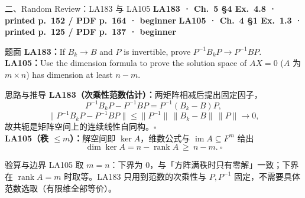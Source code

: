 \documentclass[aspectratio=169,10pt,fontset=none]{ctexbeamer}
\newcommand{\ex}[1]{\textcolor{accent}{\footnotesize\bfseries #1}}
\begin{document}
\begin{frame}[t]{二、Random Review：LA183 与 LA105}
  \leavevmode\ex{LA183 · Ch.~5 §4 Ex.~4.8 · printed p.~152 / PDF p.~164 · beginner}\quad
  \ex{LA105 · Ch.~4 §1 Ex.~1.3 · printed p.~125 / PDF p.~137 · beginner}
  \begin{block}{\footnotesize 题面}
    \scriptsize \textbf{LA183：}If $B_k\to B$ and $P$ is invertible, prove $P^{-1}B_kP\to P^{-1}BP$.\\
    \textbf{LA105：}Use the dimension formula to prove the solution space of $AX=0$ ($A$ 为 $m\times n$) has dimension at least $n-m$.
  \end{block}
  \begin{exampleblock}{\footnotesize 思路与推导}
    \scriptsize
    \textbf{LA183（次乘性范数估计）：}两矩阵相减后提出固定因子，
    $$P^{-1}B_kP-P^{-1}BP=P^{-1}(B_k-B)P,$$
    $$\|P^{-1}B_kP-P^{-1}BP\|\le\|P^{-1}\|\,\|B_k-B\|\,\|P\|\longrightarrow0,$$
    故共轭是矩阵空间上的连续线性自同构。$\square$\\[3pt]
    \textbf{LA105（秩 $\le m$）：}解空间即 $\ker A$，维数公式与 $\operatorname{im}A\subseteq F^m$ 给出
    $$\dim\ker A=n-\operatorname{rank}A\ \ge\ n-m.\ \square$$
  \end{exampleblock}
  \begin{block}{\footnotesize 验算与边界}
    \scriptsize LA105 取 $m=n$：下界为 $0$，与「方阵满秩时只有零解」一致；下界在 $\operatorname{rank}A=m$ 时取等。LA183 只用到范数的次乘性与 $P,P^{-1}$ 固定，不需要具体范数选取（有限维全部等价）。
  \end{block}
\end{frame}
\end{document}
